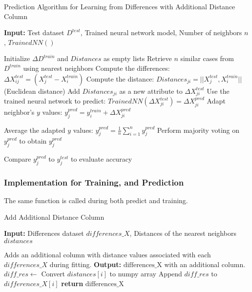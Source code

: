 \documentclass[a4paper, 12pt]{report}
\begin{document}
\begin{algorithm}[H]
	\caption{Prediction Algorithm for Learning from Differences with Additional Distance Column}
	\label{alg:learning_from_differences_variant_3_predict}
	\textbf{Input:} Test dataset $D^{test}$, Trained neural network model, Number of neighbors $n$, $Trained NN()$

	\begin{algorithmic}[1]
		\State Initialize $\Delta D^{train}$ and $Distances$ as empty lists
		    \State Retrieve $n$ similar cases from $D^{train}$ using nearest neighbors
		        \State Compute the differences: $\Delta X^{test}_{ij} = (X^{test}_j - X^{train}_i)$
		        \State Compute the distance: $Distances_{ji} = ||X^{test}_j,  X^{train}_i||$ (Euclidean distance)
		        \State Add $Distances_{ji}$ as a new attribute to $\Delta X^{test}_{ji}$
		        \State Use the trained neural network to predict: $Trained NN(\Delta X^{test}_{ji}) = \Delta X^{pred}_{ji}$
		        \State Adapt neighbor's $y$ values: $y^{pred}_j = y^{train}_i + \Delta X^{pred}_{ji}$
		    \EndFor

		        \State Average the adapted $y$ values: $y^{pred}_j = \frac{1}{n} \sum_{i=1}^{n} y^{pred}_j$
		        \State Perform majority voting on $y^{pred}_j$ to obtain $y^{pred}_j$
		    \EndIf

		    \State Compare $y^{pred}_j$ to $y^{test}_j$ to evaluate accuracy
		\EndFor
	\end{algorithmic}
\end{algorithm}

\subsubsection{Implementation for Training, and Prediction}
The same function is called during both predict and training.
\begin{algorithm}[H]
    \caption{Add Additional Distance Column}
    \textbf{Input:}  Differences dataset $differences\_X$, Distances of the nearest neighbors $distances$
    \begin{algorithmic}[1]
            \State Adds an additional column with distance values associated with each $differences\_X$ during fitting.
            \State \textbf{Output:} $\text{differences\_X}$ with an additional column.
                \State $diff\_res \gets$ Convert $distances[i]$ to numpy array
                \State Append $diff\_res$ to $differences\_X[i]$
            \EndFor
            \State \textbf{return} $\text{differences\_X}$
        \EndFunction
    \end{algorithmic}
\end{algorithm}
\end{document}
